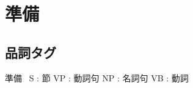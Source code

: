 \documentclass[uplatex,a4j]{jsreport}
\begin{document}
\chapter{準備}
\section{品詞タグ}
準備~\cite{pennTreebankTags}
S : 節
VP : 動詞句
NP : 名詞句
VB : 動詞
\end{document}
